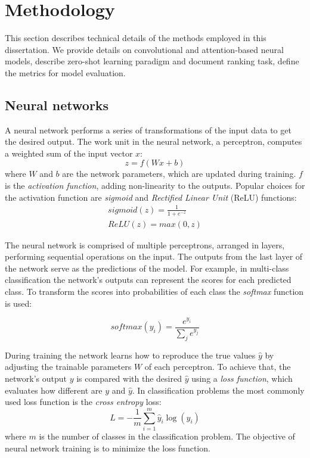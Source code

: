\section{Methodology}
\label{back_meth}
This section describes technical details of the methods employed in this dissertation. We provide details on convolutional and attention-based neural models, describe zero-shot learning paradigm and document ranking task, define the metrics for model evaluation.

\subsection{Neural networks}
A neural network performs a series of transformations of the input data to get the desired output. The work unit in the neural network, a perceptron, computes a weighted sum of the input vector $x$:
\begin{equation}
    z = f(Wx + b)
\end{equation}
where $W$ and $b$ are the network parameters, which are updated during training. $f$ is the \textit{activation function}, adding non-linearity to the outputs. Popular choices for the activation function are \textit{sigmoid} and \textit{Rectified Linear Unit} (ReLU) functions:
\vspace{-0.1pt}
\begin{gather}
    sigmoid(z) = \frac{1}{1+e^{-z}} \\
    ReLU(z) = max(0, z) 
\end{gather}

The neural network is comprised of multiple perceptrons, arranged in layers, performing sequential operations on the input. The outputs from the last layer of the network serve as the predictions of the model. For example, in multi-class classification the network's outputs can represent the scores for each predicted class. To transform the scores into probabilities of each class the \textit{softmax} function is used:

\begin{equation}
   softmax(y_i) = \frac{e^{y_i}}{\sum_j e^{y_j}}
\end{equation}

During training the network learns how to reproduce the true values $\hat{y}$ by adjusting the trainable parameters $W$ of each perceptron. To achieve that, the network's output $y$ is compared with the desired $\hat{y}$ using a \textit{loss function}, which evaluates how different are $y$ and $\hat{y}$. In classification problems the most commonly used loss function is the \textit{cross entropy} loss:
\begin{equation}
    L = - \frac{1}{m}\sum_{i=1}^m \hat{y}_i \log(y_i)
\end{equation}
where $m$ is the number of classes in the classification problem. The objective of neural network training is to minimize the loss function.

